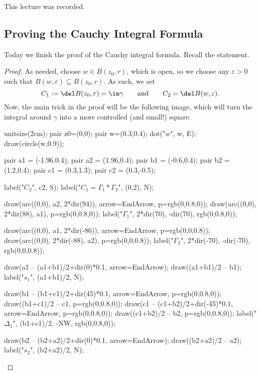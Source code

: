 
This lecture was recorded.

\subsection{Proving the Cauchy Integral Formula}
Today we finish the proof of the Cauchy integral formula. Recall the statement.
\thmcif*
\begin{proof}
	As needed, choose $w\in B(z_0,r)$, which is open, so we choose any $\varepsilon>0$ such that $\overline{B(w,\varepsilon)}\subseteq B(z_0,r)$. As such, we set
	\[C_1:=\del B(z_0,r)=\im\gamma\qquad\text{and}\qquad C_2=\del B(w,\varepsilon).\]
	Now, the main trick in the proof will be the following image, which will turn the integral around $\gamma$ into a more controlled (and small!) square.
	\begin{center}
		\begin{asy}
			unitsize(2cm);
			pair z0=(0,0);
			pair w=(0.3,0.4);
			dot("$w$", w, E);
			draw(circle(w,0.9));
			
			pair a1 = (-1.96,0.4);
			pair a2 = (1.96,0.4);
			pair b1 = (-0.6,0.4);
			pair b2 = (1.2,0.4);
			pair c1 = (0.3,1.3);
			pair c2 = (0.3,-0.5);
			
			label("$C_2$", c2, S);
			label("$C_1=\Gamma_1*\Gamma_2$", (0,2), N);
			
			draw(arc((0,0), a2, 2*dir(94)), arrow=EndArrow, p=rgb(0,0.8,0));
			draw(arc((0,0), 2*dir(88), a1), p=rgb(0,0.8,0));
			label("$\Gamma_1$", 2*dir(70), -dir(70), rgb(0,0.8,0));
			
			draw(arc((0,0), a1, 2*dir(-86)), arrow=EndArrow, p=rgb(0,0,0.8));
			draw(arc((0,0), 2*dir(-88), a2), p=rgb(0,0,0.8));
			label("$\Gamma_2$", 2*dir(-70), -dir(-70), rgb(0,0,0.8));
			
			draw(a1 -- (a1+b1)/2+dir(0)*0.1, arrow=EndArrow);
			draw((a1+b1)/2 -- b1);
			label("$s_1$", (a1+b1)/2, N);
			
			draw(b1 -- (b1+c1)/2+dir(45)*0.1, arrow=EndArrow, p=rgb(0,0.8,0));
			draw((b1+c1)/2 -- c1, p=rgb(0,0.8,0));
			draw(c1 -- (c1+b2)/2+dir(-45)*0.1, arrow=EndArrow, p=rgb(0,0.8,0));
			draw((c1+b2)/2 -- b2, p=rgb(0,0.8,0));
			label("$\Delta_1$", (b1+c1)/2, -NW, rgb(0,0.8,0));
			
			draw(b2 -- (b2+a2)/2+dir(0)*0.1, arrow=EndArrow);
			draw((b2+a2)/2 -- a2);
			label("$s_2$", (b2+a2)/2, N);
			

\end{asy}
\end{center}
\end{proof}
